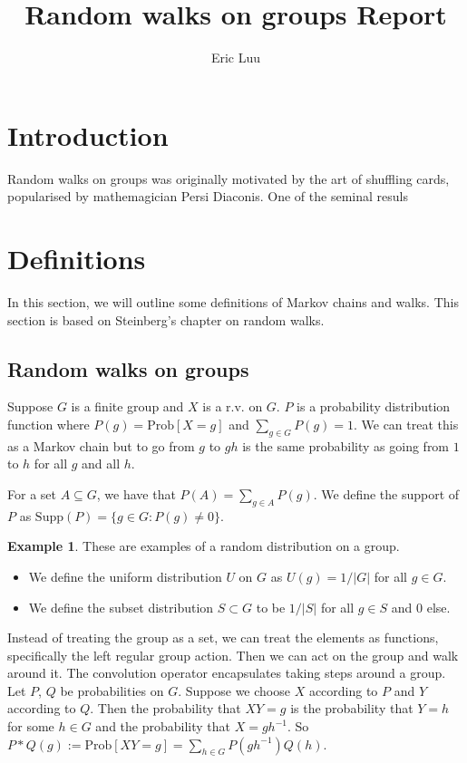 \documentclass[]{article}
\title{Random walks on groups Report}
\author{Eric Luu}
\theoremstyle{definition}
\newtheorem{example}[theorem]{Example}
\numberwithin{theorem}{section}
\numberwithin{equation}{section}
\newcommand{\supp}{\text{Supp}}
\begin{document}
\maketitle
\section{Introduction}
Random walks on groups was originally motivated by the art of shuffling cards, popularised by mathemagician Persi Diaconis. One of the seminal resuls
\section{Definitions}
In this section, we will outline some definitions of Markov chains and walks. This section is based on Steinberg's chapter on random walks\cite{steinbergProbabilityRandomWalks2012}.

\subsection{Random walks on groups}
Suppose $G$ is a finite group and $X$ is a r.v. on $G$. $P$ is a probability distribution function where $P(g) = \text{Prob}[X = g]$ and $\sum_{g\in G} P(g) = 1$. We can treat this as a Markov chain but to go from $g$ to $gh$ is the same probability as going from $1$ to $h$ for all $g$ and all $h$. 

For a set $A \subseteq G$, we have that $P(A) = \sum_{g \in A} P(g)$. We define the support of $P$ as $\supp(P) = \lbrace g \in G : P(g) \neq 0 \rbrace$. 


\begin{example}
	These are examples of a random distribution on a group. 
	\begin{itemize}
		\item We define the uniform distribution $U$ on $G$ as $U(g) = 1/|G|$ for all $g \in G$. 
		\item We define the subset distribution $S \subset G$ to be $1/|S|$ for all $ g \in S$ and 0 else.
	\end{itemize}
\end{example}

Instead of treating the group as a set, we can treat the elements as functions, specifically the left regular group action. Then we can act on the group and walk around it. The convolution operator encapsulates taking steps around a group.
Let $P$, $Q$ be probabilities on $G$. Suppose we choose $X$ according to $P$ and $Y$ according to $Q$. Then the probability that $XY = g$ is the probability that $Y = h$ for some $h \in G$ and the probability that $X = gh^{-1}$. 
So $P \ast Q(g) := \text{Prob}[XY = g] = \sum_{h\in G} P(gh^{-1})Q(h) $.
\end{document}
